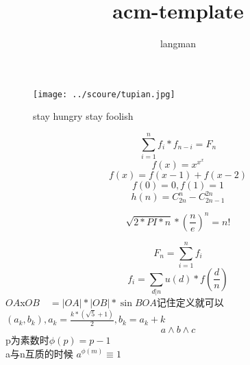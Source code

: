 \documentclass[a4paper,11pt]{article}
\author{langman}
\title{acm-template}
\begin{document}
\maketitle
\begin{CJK}{UTF8}{gbsn}
  \begin{figure}[!htb]
    \begin{center}
      \texttt{[image: ../scoure/tupian.jpg]}
      \caption{stay hungry stay foolish}
    \end{center}
  \end{figure}
$$\sum_{i=1}^n f_i*f_{n-i}=F_n$$
$$f(x)=x^{x^x}$$
$$f(x) = f(x-1)+f(x-2)$$
$$f(0) = 0,f(1) = 1$$
$$h(n) = C_{2n}^n - C_{2n-1}^{2n}$$

$$ \sqrt{2*PI*n} * (\frac{n}{e})^n = n!$$

$$ F_n = \sum_{i=1}^n f_i $$
$$ f_i = \sum_{d|n} u(d)*f(\frac{d}{n}) $$
$OA$x$OB\quad = |OA|*|OB|*\sin{BOA}$记住定义就可以
$( a_k,b_k),a_k=\frac{k*(\sqrt{5}+1)}{2} , b_k=a_k+k$
$$ a \land{b \land c} $$
p为素数时$\phi(p) = p-1 $\\
a与n互质的时候 $a^{\phi(m)}\equiv1$
\end{CJK}
\end{document}
